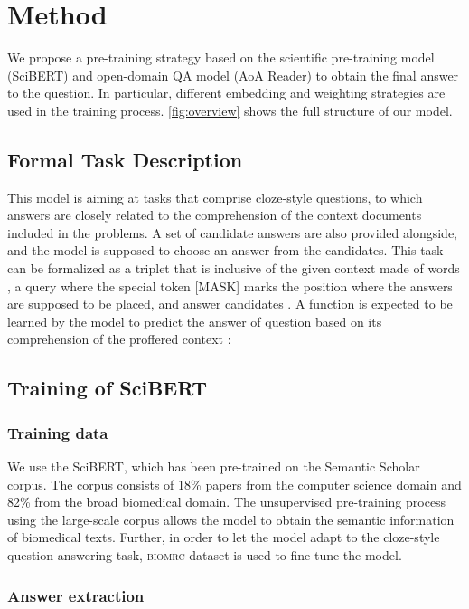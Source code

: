 \documentclass[sigconf, screen]{acmart}
\newcommand{\biomrc}{{\scshape{biomrc}}\xspace}
\newcommand{\scibert}{Sci\-BERT\xspace}
\newcommand{\aoa}{AoA Reader\xspace}
\begin{document}
\section{Method}
We propose a pre-training strategy based on the scientific pre-training model (\scibert) and open-domain QA model (\aoa ) to obtain the final answer to the question. In particular, different embedding and weighting strategies are used in the training process. \cref{fig:overview} shows the full structure of our model.

\subsection{Formal Task Description}
This model is aiming at tasks that comprise cloze-style questions, to which answers are closely related to the comprehension of the context documents included in the problems. A set of candidate answers are also provided alongside, and the model is supposed to choose an answer from the candidates. This task can be formalized as a triplet  that is inclusive of the given context  made of words , a query  where the special token [MASK] marks the position where the answers are supposed to be placed, and answer candidates . A function  is expected to be learned by the model to predict the answer  of question  based on its comprehension of the proffered context :


\subsection{Training of \scibert}

\subsubsection{Training data}

We use the \scibert \cite{beltagySciBERTPretrainedLanguage2019}, which has been pre-trained on the Semantic Scholar corpus. The corpus consists of 18\% papers from the computer science domain and 82\% from the broad biomedical domain. The unsupervised pre-training process using the large-scale corpus allows the model to obtain the semantic information of biomedical texts. Further, in order to let the model adapt to the cloze-style question answering task, \biomrc dataset is used to fine-tune the model.

\subsubsection{Answer extraction}
\end{document}
